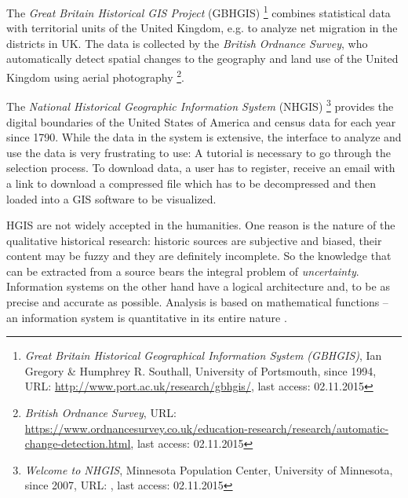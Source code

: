 
The \emph{Great Britain Historical GIS Project} (GBHGIS)
\footnote{
  \textit{Great Britain Historical Geographical Information System (GBHGIS)},
  Ian Gregory \& Humphrey R. Southall, University of Portsmouth, since 1994,
  URL: \url{http://www.port.ac.uk/research/gbhgis/},
  last access: 02.11.2015
}
combines statistical data with territorial units of the United Kingdom, e.g. to analyze net migration in the districts in UK. The data is collected by the \emph{British Ordnance Survey}, who automatically detect spatial changes to the geography and land use of the United Kingdom using aerial photography
\footnote{
  \textit{British Ordnance Survey},
  URL: \url{https://www.ordnancesurvey.co.uk/education-research/research/automatic-change-detection.html},
  last access: 02.11.2015
}.

The \emph{National Historical Geographic Information System} (NHGIS)
\footnote{
  \textit{Welcome to NHGIS},
  Minnesota Population Center, University of Minnesota,
  since 2007,
  URL: \url{},
  last access: 02.11.2015
}
provides the digital boundaries of the United States of America and census data for each year since 1790.
While the data in the system is extensive, the interface to analyze and use the data is very frustrating to use: A tutorial is necessary to go through the selection process. To download data, a user has to register, receive an email with a link to download a compressed file which has to be decompressed and then loaded into a GIS software to be visualized.

HGIS are not widely accepted in the humanities. One reason is the nature of the qualitative historical research: historic sources are subjective and biased, their content may be fuzzy and they are definitely incomplete. So the knowledge that can be extracted from a source bears the integral problem of \emph{uncertainty}. Information systems on the other hand have a logical architecture and, to be as precise and accurate as possible. Analysis is based on mathematical functions -- an information system is quantitative in its entire nature
\cite[p. 2]{knowles2008placing}.




